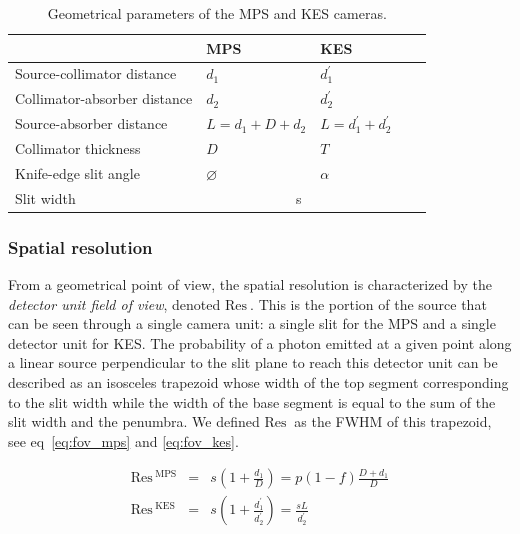 \documentclass[a4paper,english]{article}
\begin{document}
\begin{table}[h]
\centering
\begin{tabular}{lllll}
	\midrule
																& MPS               & KES \\
	\midrule
	Source-collimator distance		& $d_1$             & $d_1^{'}$ \\
 	Collimator-absorber distance	& $d_2$             & $d_2^{'}$ \\
	Source-absorber distance			& $L=d_1+D+d_2$			& $L=d_1^{'}+d_2^{'}$\\
 	Collimator thickness 					& $D$               & $T$ \\
	Knife-edge slit angle					& $\varnothing$			& $\alpha$\\	
	\cline{2-3}
	Slit width										& \multicolumn{2}{c}{s} \\
	\midrule
\end{tabular}
\caption{Geometrical parameters of the MPS and KES cameras.}
\label{table:CamerasParameters}
\end{table}



\subsubsection{Spatial resolution}

\newcommand\FOV{\textrm{Res}\,}
\newcommand\MPS{\textrm{MPS}}
\newcommand\KES{\textrm{KES}}
\newcommand\du{}
\newcommand\DE{\textrm{Eff}\,}

From a geometrical point of view, the spatial resolution is characterized by the
\textit{detector unit field of view}, denoted $\FOV_{\du}$. This is the portion of
the source that can be seen through a single camera unit: a single slit for the
MPS and a single detector unit for KES. The probability of a photon emitted at a
given point along a linear source perpendicular to the slit plane to reach
this detector unit can be described as an isosceles trapezoid whose width of the top segment corresponding to the slit width while the width of the base segment is equal to the sum of the slit width and the penumbra. We defined $\FOV_{\du}$
as the FWHM of this trapezoid, see eq~\ref{eq:fov_mps} and \ref{eq:fov_kes}.

\begin{eqnarray}
  \label{eq:fov_mps}
  \FOV_{\du}^{\MPS} & = & s\left(1+ \frac{d_1}{D}\right) = p(1-f) \frac{D+d_1}{D} \\
  \label{eq:fov_kes}
   \FOV_{\du}^{\KES} & = & s\left(1+ \frac{d_1^{'}}{d_2^{'}}\right) = \frac{sL}{d_2^{'}}
\end{eqnarray}
\end{document}
